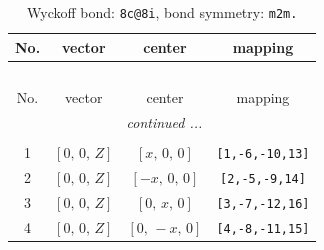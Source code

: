 \documentclass[fleqn,8pt]{jsarticle}
\begin{document}
\renewcommand{\arraystretch}{1.2}
\begin{longtable}{cccc}
\caption{Wyckoff bond: {\tt 8c@8i}, bond symmetry: {\tt m2m.}}
 \\
 \hline \hline
No. & vector & center & mapping \\ \hline \endfirsthead

\multicolumn{3}{l}{\tablename\ \thetable{}} \\
 \hline \hline
No. & vector & center & mapping \\ \hline \endhead

 \hline \hline
\multicolumn{3}{r}{\footnotesize\it continued ...} \\ \endfoot

 \hline \hline
\multicolumn{3}{r}{} \\ \endlastfoot

1 & $\left[ 0,\, 0,\, Z \right]$ & $\left[ x,\, 0,\, 0 \right]$ & {\tt [1,-6,-10,13]} \\ \hline
2 & $\left[ 0,\, 0,\, Z \right]$ & $\left[ - x,\, 0,\, 0 \right]$ & {\tt [2,-5,-9,14]} \\ \hline
3 & $\left[ 0,\, 0,\, Z \right]$ & $\left[ 0,\, x,\, 0 \right]$ & {\tt [3,-7,-12,16]} \\ \hline
4 & $\left[ 0,\, 0,\, Z \right]$ & $\left[ 0,\, - x,\, 0 \right]$ & {\tt [4,-8,-11,15]} \\
\end{longtable}
\renewcommand{\arraystretch}{1.2}
\end{document}
